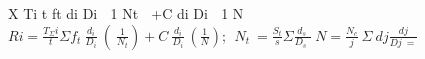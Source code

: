 X
Ti
t
ft
di
Di

1
Nt

+C
di
Di

1
N
\(Ri=\frac{T_{\Sigma}i}{t}\Sigma f_t\ \frac{d_i}{D_i}\ \left(\ \frac{1}{N_t}\right)+C\ \frac{d_i}{D_i}\ \left(\frac{1}{N}\right);\ \ N_t\ =\frac{S_t}{s}\Sigma\frac{d_s\ }{D_s\ \ }\ N=\frac{N_c}{j}\ \Sigma\ dj\frac{dj}{Dj\ =}\)